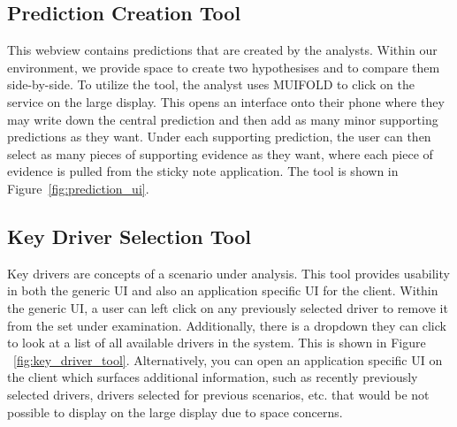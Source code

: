 \subsection{Prediction Creation Tool}

This webview contains predictions that are created by the analysts. Within our
environment, we provide space to create two hypothesises and to compare them
side-by-side. To utilize the tool, the analyst uses MUIFOLD to click on the
service on the large display. This opens an interface onto their phone where
they may write down the central prediction and then add as many minor supporting
predictions as they want. Under each supporting prediction, the user can then select
as many pieces of supporting evidence as they want, where each piece of evidence is
pulled from the sticky note application. The tool is shown in Figure~\ref{fig:prediction_ui}.

\subsection{Key Driver Selection Tool}

Key drivers are concepts of a scenario under analysis.
This tool provides usability in both the generic UI and also an
application specific UI for the client. Within the generic UI, a user
can left click on any previously selected driver to remove it
from the set under examination. Additionally, there is a dropdown
they can click to look at a list of all available drivers in the
system. This is shown in Figure ~\ref{fig:key_driver_tool}.
Alternatively, you can open an application specific UI on the client
which surfaces additional information, such as recently previously
selected drivers, drivers selected for previous scenarios, etc. that
would be not possible to display on the large display due to space
concerns.

